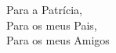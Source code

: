 \begin{dedicatory}
\vfill
\begin{center}
Para a Patrícia,\\
Para os meus Pais,\\
Para os meus Amigos\\
\end{center}
\vfill
\end{dedicatory}
